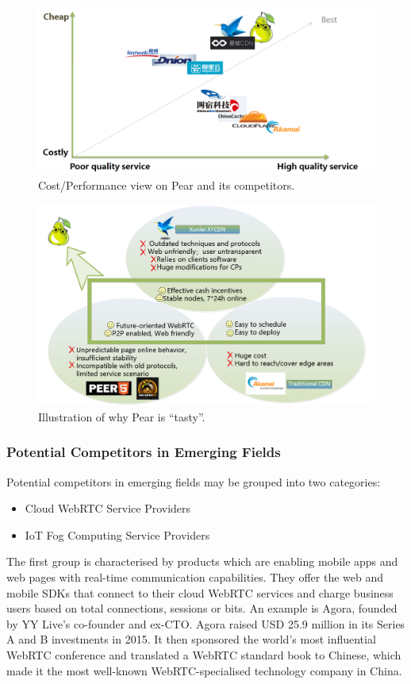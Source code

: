 \begin{figure}[ht]
	\centering
	\includegraphics[width=.8\textwidth]{fig/biz/cost-performance-competitors.png}
	\caption{Cost/Performance view on Pear and its competitors.} \label{fig:cost-performance-competitors}
\end{figure}

\begin{figure}[htb]
	\centering
	\includegraphics[width=.8\textwidth]{fig/biz/all-essences-advantage.png}
	\caption{Illustration of why Pear is ``tasty''.} \label{fig:all-essences-advantage}
\end{figure}

\subsubsection{Potential Competitors in Emerging Fields}
Potential competitors in emerging fields may be grouped into two categories: 
\begin{itemize}
	\item Cloud WebRTC Service Providers 
	\item IoT Fog Computing Service Providers
\end{itemize} 

The first group is characterised by products which are enabling mobile apps and web pages with real-time communication capabilities. They offer the web and mobile SDKs that connect to their cloud WebRTC services and charge business users based on total connections, sessions or bits. An example is Agora, founded by YY Live's co-founder and ex-CTO. Agora raised USD 25.9 million in its Series A and B investments in 2015. It then sponsored the world's most influential WebRTC conference and translated a WebRTC standard book to Chinese, which made it the most well-known WebRTC-specialised technology company in China. 

